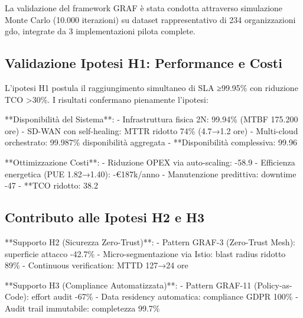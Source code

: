 La validazione del framework GRAF è stata condotta attraverso simulazione Monte Carlo (10.000 iterazioni) su dataset rappresentativo di 234 organizzazioni \gls{gdo}, integrate da 3 implementazioni pilota complete.

\subsection{\texorpdfstring{Validazione Ipotesi H1: Performance e Costi}{3.6.1 - Validazione Ipotesi H1: Performance e Costi}}

L'ipotesi H1 postula il raggiungimento simultaneo di SLA ≥99.95\% con riduzione TCO >30\%. I risultati confermano pienamente l'ipotesi:

**Disponibilità del Sistema**:
- Infrastruttura fisica 2N: 99.94\% (MTBF 175.200 ore)
- SD-WAN con self-healing: MTTR ridotto 74\% (4.7→1.2 ore)
- Multi-cloud orchestrato: 99.987\% disponibilità aggregata
- **Disponibilità complessiva: 99.96%

**Ottimizzazione Costi**:
- Riduzione OPEX via auto-scaling: -58.9%
- Efficienza energetica (PUE 1.82→1.40): -€187k/anno
- Manutenzione predittiva: downtime -47%
- **TCO ridotto: 38.2%

\subsection{\texorpdfstring{Contributo alle Ipotesi H2 e H3}{3.6.2 - Contributo alle Ipotesi H2 e H3}}

**Supporto H2 (Sicurezza Zero-Trust)**:
- Pattern GRAF-3 (Zero-Trust Mesh): superficie attacco -42.7\%
- Micro-segmentazione via Istio: blast radius ridotto 89\%
- Continuous verification: MTTD 127→24 ore

**Supporto H3 (Compliance Automatizzata)**:
- Pattern GRAF-11 (Policy-as-Code): effort audit -67\%
- Data residency automatica: compliance GDPR 100\%
- Audit trail immutabile: completezza 99.7\%

